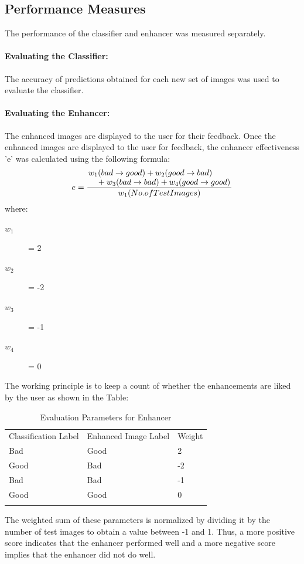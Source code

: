 \subsection{Performance Measures}
The performance of the classifier and enhancer was measured separately.
\paragraph{Evaluating the Classifier:} The accuracy of predictions obtained for each new set of images was used to evaluate the classifier.
\paragraph{Evaluating the Enhancer:} The enhanced images are displayed to the user for their feedback. Once the enhanced images are displayed to the user for feedback, the enhancer effectiveness 'e' was calculated using the following formula:\\

\[e= \frac{\splitfrac{w_1(bad\rightarrow good)+w_2(good\rightarrow bad)}{+w_3(bad\rightarrow bad)+w_4(good\rightarrow good)}}{w_1(No. of Test Images)} \]
where:
\begin{description}
\item[$w_1$] = 2
\item[$w_2$] = -2
\item[$w_3$] = -1
\item[$w_4$] = 0
\end{description}
 The working principle is to keep a count of whether the enhancements are liked by the user as shown in the Table:

\begin{table}[H]
\caption{Evaluation Parameters for Enhancer}
\label{tab:1}       %
\begin{tabular}{lll}
\hline\noalign{\smallskip}
Classification Label & Enhanced Image Label & Weight  \\
\noalign{\smallskip}\hline\noalign{\smallskip}
Bad & Good & 2 \\
Good & Bad & -2 \\
Bad & Bad & -1 \\
Good & Good & 0 \\
\noalign{\smallskip}\hline
\end{tabular}
\end{table}
The weighted sum of these parameters is normalized by dividing it by the number of test images to obtain a value between -1 and 1. Thus, a more positive score indicates that the enhancer performed well and a more negative score implies that the enhancer did not do well.




